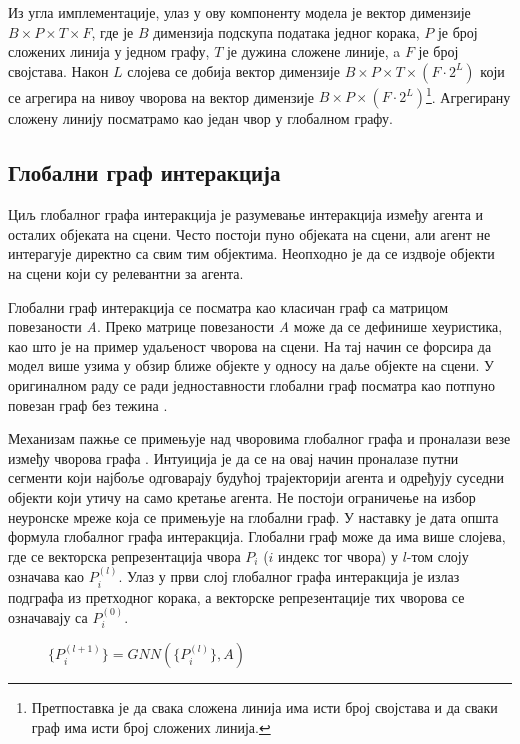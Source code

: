 \documentclass[11pt,oneside]{memoir}
\begin{document}
Из угла имплементације, улаз у ову компоненту модела је вектор димензије $B\times P\times T\times F$,
где је $B$ димензија подскупа података једног корака, 
$P$ је број сложених линија у једном графу, $T$ је дужина сложене линије, a $F$ је број својстава. Након $L$ слојева се добија вектор димензије 
$B\times P\times T\times (F \cdot 2^{L})$ који се агрегира на нивоу чворова на вектор димензије
$B\times P\times (F \cdot 2^{L})$\footnote{Претпоставка је да свака сложена линија има исти број својстава и да сваки граф има исти број сложених линија.}.
Агрегирану сложену линију посматрамо као један чвор у глобалном графу.
         
\subsection{Глобални граф интеракција}

Циљ глобалног графа интеракција је разумевање интеракција између агента и осталих објеката на сцени. Често постоји пуно објеката
на сцени, али агент не интерагује директно са свим тим објектима. Неопходно је да се издвоје објекти на сцени који су релевантни за агента.

Глобални граф интеракција се посматра као класичан граф са матрицом повезаности \textit{A}. Преко матрице повезаности \textit{A}
може да се дефинише хеуристика, као што је на пример удаљеност чворова на сцени. На тај начин се форсира да модел више узима у обзир ближе објекте
у односу на даље објекте на сцени.
У оригиналном раду се ради једноставности глобални граф посматра као потпуно повезан граф без тежина \cite{vectornet}.

Механизам пажње се примењује над
чворовима глобалног графа и проналази везе између чворова графа \cite{attention_is_all_you_need}. Интуиција је да се на овај начин 
проналазе путни сегменти који најбоље одговарају будућој трајекторији агента и
одређују суседни објекти који утичу на само кретање агента. Не постоји ограничење на избор неуронске мреже која се примењује на глобални граф.
У наставку је дата општа формула глобалног графа интеракција. Глобални граф може да има више слојева, где
се векторска репрезентација чвора $P_{i}$ ($i$ индекс тог чвора) у $l$-том слоју означава као $P_{i}^{(l)}$. 
Улаз у први слој глобалног графа интеракција је излаз подграфа из претходног корака, а векторске репрезентације тих чворова се означавају
са $P_{i}^{(0)}$.

\begin{figure}[H]
  \centering
  $\{P^{(l+1)}_{i}\} = GNN(\{P^{(l)}_{i}\}, A)$
\end{figure}
\end{document}
